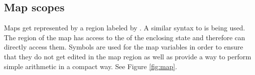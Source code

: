 \subsection{Map scopes}
Maps get represented by a region labeled by . A similar syntax to  is being used. The region of the map has access to the  of the enclosing state and therefore can directly access them. Symbols are used for the map variables in order to ensure that they do not get edited in the map region as well as provide a way to perform simple arithmetic in a compact way. See Figure \ref{fig:map}.

